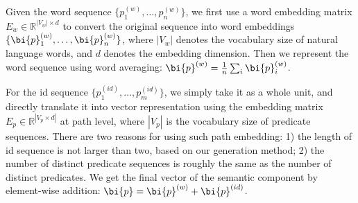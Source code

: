
Given the word sequence $\{p_1^{(w)}, \dots, p_n^{(w)}\}$, %
we first use a word embedding matrix $E_w \in \mathbb{R}^{|V_w| \times d}$ to convert 
the original sequence into word embeddings $\{\bi{p}_1^{(w)}, \dots, \bi{p}_n^{(w)}\}$,
where $|V_w|$ denotes the vocabulary size of natural language words,
and $d$ denotes the embedding dimension.
Then we represent the word sequence using word averaging:
$\bi{p}^{(w)} = \frac{1}{n} \sum_{i}{\bi{p}_i^{(w)}}$.


For the id sequence $\{p_1^{(id)}, \dots, p_m^{(id)}\}$,
we simply take it as a whole unit, and directly translate it into vector representation
using the embedding matrix $E_p \in \mathbb{R}^{|V_p \times d|}$ at path level,
where $|V_p|$ is the vocabulary size of predicate sequences.
There are two reasons for using such path embedding:
1) the length of id sequence is not larger than two, based on our generation method;
2) the number of distinct predicate sequences is roughly the same as the number of distinct predicates.
We get the final vector of the semantic component by element-wise addition:
$\bi{p} = \bi{p}^{(w)} + \bi{p}^{(id)}$.




